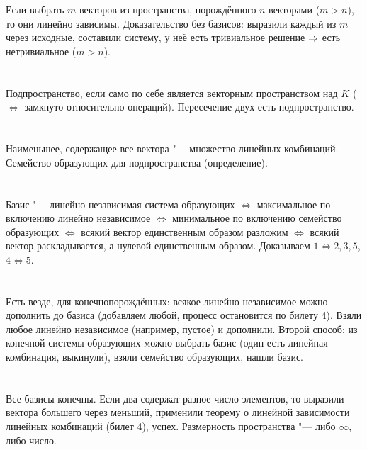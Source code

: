 \section{} %
Если выбрать $m$ векторов из пространства, порождённого $n$ векторами ($m>n$), то они линейно зависимы.
Доказательство без базисов: выразили каждый из $m$ через исходные, составили систему, у неё есть тривиальное решение $\Rightarrow$ есть нетривиальное ($m>n$).

\section{} %
Подпространство, если само по себе является векторным пространством над $K$ ($\iff$ замкнуто относительно операций).
Пересечение двух есть подпространство.

\section{} %
Наименьшее, содержащее все вектора "--- множество линейных комбинаций.
Семейство образующих для подпространства (определение).

\section{} %
Базис "--- линейно независимая система образующих
$\iff$ максимальное по включению линейно независимое
$\iff$ минимальное по включению семейство образующих
$\iff$ всякий вектор единственным образом разложим
$\iff$ всякий вектор раскладывается, а нулевой единственным образом.
Доказываем $1 \iff 2, 3, 5$, $4 \iff 5$.

\section{} %
Есть везде, для конечнопорождённых: всякое линейно независимое можно дополнить до базиса (добавляем любой, процесс остановится по билету 4).
Взяли любое линейно независимое (например, пустое) и дополнили.
Второй способ: из конечной системы образующих можно выбрать базис (один есть линейная комбинация, выкинули), взяли семейство образующих, нашли базис.

\section{} %
Все базисы конечны.
Если два содержат разное число элементов, то выразили вектора большего через меньший, применили теорему о линейной зависимости линейных комбинаций (билет 4), успех.
Размерность пространства "--- либо $\infty$, либо число.

